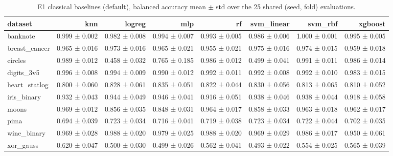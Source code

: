 \begin{table}[ht]
\centering
\caption{E1 classical baselines (default), balanced accuracy mean $\pm$ std over the 25 shared (seed, fold) evaluations.}
\label{tab:e1-default-balanced_accuracy}
\begin{tabular}{lrrrrrrr}
\toprule
dataset & knn & logreg & mlp & rf & svm\_linear & svm\_rbf & xgboost \\
\midrule
banknote & 0.999 ± 0.002 & 0.982 ± 0.008 & 0.994 ± 0.007 & 0.993 ± 0.005 & 0.986 ± 0.006 & 1.000 ± 0.001 & 0.995 ± 0.005 \\
breast\_cancer & 0.965 ± 0.016 & 0.973 ± 0.016 & 0.965 ± 0.021 & 0.955 ± 0.021 & 0.975 ± 0.016 & 0.974 ± 0.015 & 0.959 ± 0.018 \\
circles & 0.989 ± 0.012 & 0.458 ± 0.032 & 0.765 ± 0.185 & 0.986 ± 0.012 & 0.499 ± 0.041 & 0.991 ± 0.011 & 0.986 ± 0.014 \\
digits\_3v5 & 0.996 ± 0.008 & 0.994 ± 0.009 & 0.990 ± 0.012 & 0.992 ± 0.011 & 0.992 ± 0.008 & 0.992 ± 0.010 & 0.983 ± 0.015 \\
heart\_statlog & 0.800 ± 0.060 & 0.828 ± 0.061 & 0.835 ± 0.051 & 0.822 ± 0.044 & 0.830 ± 0.056 & 0.813 ± 0.065 & 0.810 ± 0.052 \\
iris\_binary & 0.932 ± 0.043 & 0.944 ± 0.049 & 0.946 ± 0.041 & 0.916 ± 0.051 & 0.938 ± 0.046 & 0.938 ± 0.044 & 0.918 ± 0.058 \\
moons & 0.969 ± 0.012 & 0.856 ± 0.035 & 0.848 ± 0.031 & 0.964 ± 0.017 & 0.858 ± 0.033 & 0.963 ± 0.018 & 0.962 ± 0.017 \\
pima & 0.694 ± 0.039 & 0.723 ± 0.034 & 0.716 ± 0.041 & 0.719 ± 0.038 & 0.723 ± 0.034 & 0.722 ± 0.044 & 0.702 ± 0.035 \\
wine\_binary & 0.969 ± 0.028 & 0.988 ± 0.020 & 0.979 ± 0.025 & 0.988 ± 0.020 & 0.969 ± 0.029 & 0.986 ± 0.017 & 0.950 ± 0.061 \\
xor\_gauss & 0.620 ± 0.047 & 0.500 ± 0.030 & 0.499 ± 0.026 & 0.562 ± 0.041 & 0.493 ± 0.022 & 0.554 ± 0.025 & 0.565 ± 0.039 \\
\bottomrule
\end{tabular}
\end{table}
